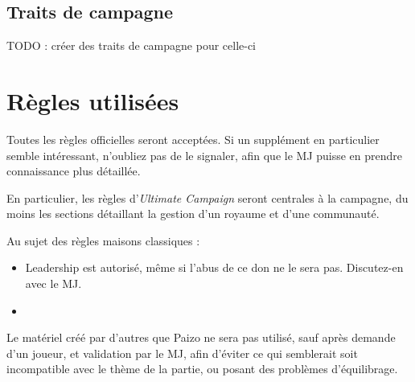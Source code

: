 \documentclass[letterpaper,10pt,twoside,twocolumn,openany]{book}
\begin{document}
\section{Traits de campagne}
TODO : créer des traits de campagne pour celle-ci
\chapter{Règles utilisées}
Toutes les règles officielles seront acceptées. Si un supplément en particulier semble intéressant, n'oubliez pas de le signaler, afin que le MJ puisse en prendre connaissance plus détaillée. 

En particulier, les règles d'\textit{Ultimate Campaign} seront centrales à la campagne, du moins les sections détaillant la gestion d'un royaume et d'une communauté.

Au sujet des règles maisons classiques : 
\begin{itemize}
    \item Leadership est autorisé, même si l'abus de ce don ne le sera pas. Discutez-en avec le MJ.
    \item 
\end{itemize}

Le matériel créé par d'autres que Paizo ne sera pas utilisé, sauf après demande d'un joueur, et validation par le MJ, afin d'éviter ce qui semblerait soit incompatible avec le thème de la partie, ou posant des problèmes d'équilibrage.
\end{document}
